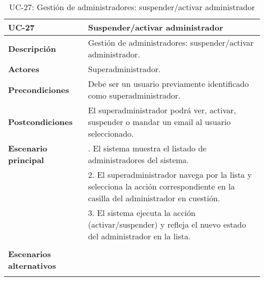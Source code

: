 \begin{table}[H]
  \begin{center}
    \begin{tabularx}{16.4cm}{|l|X|}
      \hline
      \textbf{UC-27} & \textbf{Suspender/activar administrador}\\
      \hline
      \textbf{Descripción} & Gestión de administradores: suspender/activar administrador. \\
      \hline
      \textbf{Actores} & Superadministrador.\\
      \hline
      \textbf{Precondiciones} & Debe ser un usuario previamente identificado como superadministrador.\\
      \hline
      \textbf{Postcondiciones} & El superadministrador podrá ver, activar, suspender o mandar un email al usuario seleccionado.\\
      \hline
      \textbf{Escenario principal} & \smallskip 1. El sistema muestra el listado de administradores del sistema.\\
      & 2. El superadministrador navega por la lista y selecciona la acción correspondiente en la casilla del administrador en cuestión.\\
      & 3. El sistema ejecuta la acción (activar/suspender) y refleja el nuevo estado del administrador en la lista. \\
      & \\
      \hline
      \textbf{Escenarios alternativos} & \\
      & \\
      \hline
    \end{tabularx}
    \caption{UC-27: Gestión de administradores: suspender/activar administrador}
  \end{center}
\end{table}


